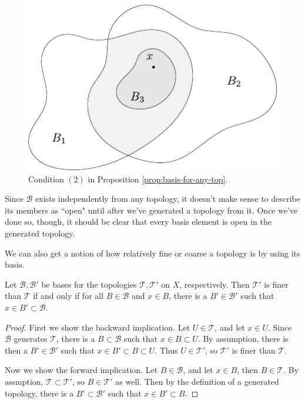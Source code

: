 \documentclass[twoside,10pt]{report}
\begin{document}
\begin{figure}[H]
	\centering
	\includegraphics[scale=1]{fig/basis.pdf}
	\caption{Condition $(2)$ in Proposition \ref{prop:basis-for-any-top}.}
\end{figure}

\begin{note}
Since $\mathcal{B}$ exists independently from any topology, it doesn't make sense to describe its members as ``open" until after we've generated a topology from it. Once we've done so, though, it should be clear that every basis element is open in the generated topology.
\end{note}

We can also get a notion of how relatively fine or coarse a topology is by using its basis.

\begin{prop}
	Let $\mathcal{B}, \mathcal{B}'$ be bases for the topologies $\mathcal{T},\mathcal{T}'$ on $X$, respectively. Then $\mathcal{T}'$ is finer than $\mathcal{T}$ if and only if for all $B \in \mathcal{B}$ and $x \in B$, there is a $B' \in \mathcal{B}'$ such that $x \in B' \subset \mathcal{B}$.
\end{prop}
\begin{proof}
	First we show the backward implication. Let $U \in \mathcal{T}$, and let $x \in U$. Since $\mathcal{B}$ generates $\mathcal{T}$, there is a $B \subset \mathcal{B}$ such that $x \in B \subset U$. By assumption, there is then a $B' \in \mathcal{B}'$ such that $x \in B' \subset B \subset U$. Thus $U \in \mathcal{T}'$, so $\mathcal{T}'$ is finer than $\mathcal{T}$.

	Now we show the forward implication. Let $B \in \mathcal{B}$, and let $x \in B$, then $B \in \mathcal{T}$. By assmption, $\mathcal{T} \subset \mathcal{T}'$, so $B \in \mathcal{T}'$ as well. Then by the definition of a generated topology, there is a $B' \subset \mathcal{B}'$ such that $x \in B' \subset B$.
\end{proof}
\end{document}
